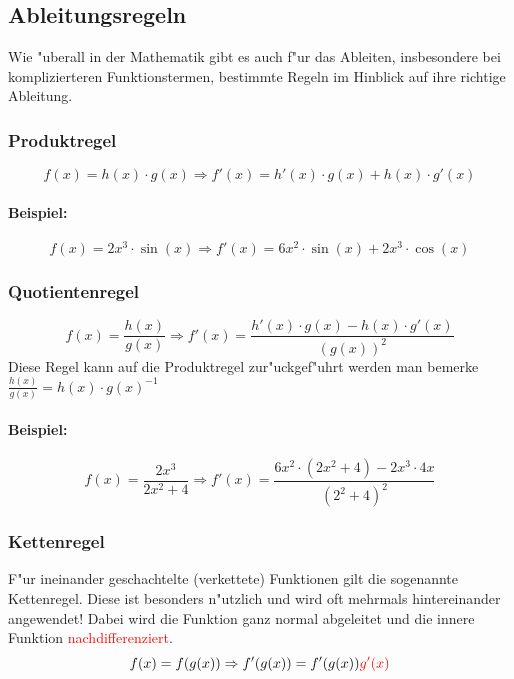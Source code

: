 \subsection{Ableitungsregeln}
Wie "uberall in der Mathematik gibt es auch f"ur das Ableiten, insbesondere bei komplizierteren Funktionstermen, bestimmte Regeln im Hinblick auf ihre richtige Ableitung.

\subsubsection{Produktregel}
\begin{equation*}
f(x) = h(x) \cdot g(x) \Rightarrow f'(x)=h'(x) \cdot g(x)+h(x) \cdot g'(x)
\end{equation*}

\paragraph{Beispiel:}
\begin{equation*}
f(x)=2x^3 \cdot \sin(x)\Rightarrow f'(x)=6x^2 \cdot \sin(x)+2x^3 \cdot \cos(x)
\end{equation*}

\subsubsection{Quotientenregel}
\begin{equation*}
f(x)=\frac{h(x)}{g(x)} \Rightarrow f'(x)=\frac{h'(x) \cdot g(x)-h(x) \cdot g'(x)}{(g(x))^2}
\end{equation*}
Diese Regel kann auf die Produktregel zur"uckgef"uhrt werden man bemerke $\frac{h(x)}{g(x)} = h(x) \cdot g(x)^{-1}$

\paragraph{Beispiel:}
\begin{equation*}
f(x)=\frac{2x^3}{2x^2+4} \Rightarrow f'(x)=\frac{6x^2 \cdot (2x^2+4)-2x^3 \cdot 4x}{(2^2+4)^2}
\end{equation*}

\subsubsection{Kettenregel}
F"ur ineinander geschachtelte (verkettete) Funktionen gilt die sogenannte Kettenregel. Diese ist besonders n"utzlich und wird oft mehrmals hintereinander angewendet! Dabei wird die Funktion ganz normal abgeleitet und die innere Funktion \textcolor{red}{nachdifferenziert}.
\begin{equation*}
f(x)=f(g(x))\Rightarrow f'(g(x))=f'(g(x))\textcolor{red}{g'(x)}
\end{equation*}

